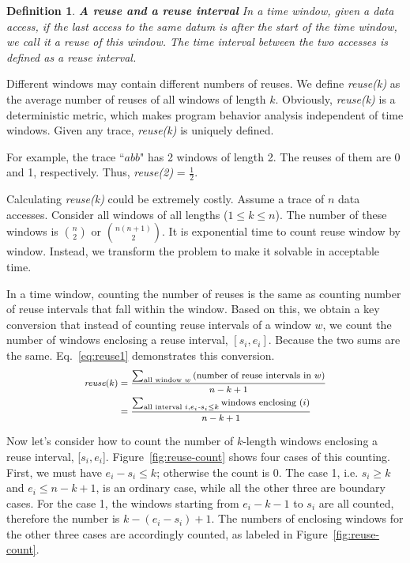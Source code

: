 \documentclass[preprint,nocopyrightspace,10pt]{sigplanconf}
\newtheorem{defn}{Definition}
\begin{document}
\begin{defn}{\bf A reuse and a reuse interval}
  In a time window, given a data access, if the last access to the 
  same datum is after the start of the time window, we call it a
  reuse of this window. The time interval between the two accesses 
  is defined as a reuse interval.
\end{defn}

Different windows may contain different numbers of reuses. We define
\emph{reuse(k)} as the average number of reuses of
all windows of length $k$. Obviously, \emph{reuse(k)} is a deterministic
metric, which makes program behavior analysis independent of time windows.
Given any trace, \emph{reuse(k)} is uniquely defined.

For example, the trace ``$abb$" has 2 windows of length 2. The 
reuses of them are 0 and 1, respectively. Thus, \emph{reuse(2)}
= $\frac{1}{2}$.

Calculating \emph{reuse(k)} could be extremely costly. 
Assume a trace of $n$ data accesses. Consider all windows 
of all lengths ($1\le k \le n$). The number of these windows is 
$n \choose 2$ or $n(n+1) \choose 2$. It is exponential time to 
count reuse window by window. Instead, we transform 
the problem to make it solvable in acceptable time.

In a time window, counting the number of reuses 
is the same as counting number of reuse intervals that fall 
within the window. Based on this, we obtain a key conversion that
instead of counting reuse intervals of a window $w$, we count the number
of windows enclosing a reuse interval, $[s_i, e_i]$. Because the two sums are the
same. Eq.~\ref{eq:reuse1} demonstrates this conversion.
\begin{equation}
\small
\begin{split}
\textit{reuse}(k) & = \frac{\sum_{\text{all window } w}\left
    (\text{number of reuse intervals in } w \right )}{n-k+1} \\
& = \frac{\sum_{\text{all interval } i, e_i\textit{-}s_i \le k}
  \text{windows enclosing }(i)}{n-k+1} 
\end{split}
\label{eq:reuse1}
\end{equation}

Now let's consider how to count the number of $k$-length windows enclosing 
a reuse interval,  [$s_i, e_i$]. Figure~\ref{fig:reuse-count} shows four
cases of this counting. First, we must have $e_i - s_i \le k$; otherwise the 
count is 0. The case 1, i.e. $s_i \ge k$ and $e_i \le n - k + 1$, 
is an ordinary case, while all the other three are boundary cases. For the case 1, 
the windows starting from $e_i-k-1$ to $s_i$ are all counted, therefore the number is
$k- (e_i -s_i) + 1$. The numbers of enclosing windows for the other three
cases are accordingly counted, as labeled in Figure~\ref{fig:reuse-count}.
\end{document}
